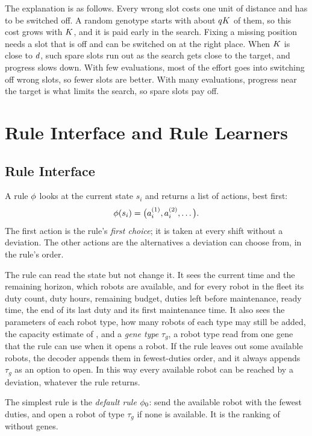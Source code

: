 \documentclass[journal]{IEEEtran}
\begin{document}
The explanation is as follows.
Every wrong slot costs one unit of distance and has to be switched off.
A random genotype starts with about $qK$ of them, so this cost grows with $K$, and it is paid early in the search.
Fixing a missing position needs a slot that is off and can be switched on at the right place.
When $K$ is close to $d$, such spare slots run out as the search gets close to the target, and progress slows down.
With few evaluations, most of the effort goes into switching off wrong slots, so fewer slots are better.
With many evaluations, progress near the target is what limits the search, so spare slots pay off.



\section{Rule Interface and Rule Learners}
\label{sec:s-learners}

\subsection{Rule Interface}

A rule $\phi$ looks at the current state $s_i$ and returns a list of actions, best first:
\begin{equation}
  \phi(s_i) = \bigl(a_i^{(1)}, a_i^{(2)}, \dots\bigr).
\end{equation}
The first action is the rule's \emph{first choice}; it is taken at every shift without a deviation.
The other \reuse actions are the alternatives a deviation can choose from, in the rule's order.

The rule can read the state but not change it.
It sees the current time and the remaining horizon, which robots are available,
and for every robot in the fleet its duty count, duty hours, remaining budget, duties left before maintenance, ready time, the end of its last duty and its first maintenance time.
It also sees the parameters of each robot type, how many robots of each type may still be added,
the capacity estimate of ,
and a \emph{gene type} $\tau_g$, a robot type read from one gene that the rule can use when it opens a robot.
If the rule leaves out some available robots, the decoder appends them in fewest-duties order, and it always appends $\tau_g$ as an option to open.
In this way every available robot can be reached by a deviation, whatever the rule returns.

The simplest rule is the \emph{default rule} $\phi_0$:
send the available robot with the fewest duties, and open a robot of type $\tau_g$ if none is available.
It is the ranking of  without genes.
\end{document}
